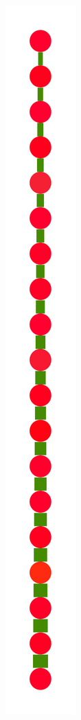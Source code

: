 \documentclass[a4paper,10pt]{article}
\begin{document}
\begin{figure}
{    \includegraphics[scale=.14]{../figures/vector/6-3-recursion-induced-7.pdf}
}
\end{figure}
\end{document}
